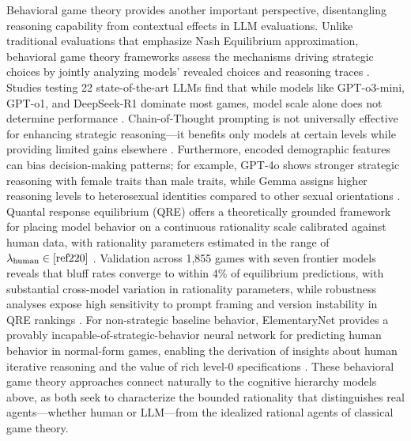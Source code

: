 \documentclass[11pt]{article}
\begin{document}
Behavioral game theory provides another important perspective, disentangling reasoning capability from contextual effects in LLM evaluations. Unlike traditional evaluations that emphasize Nash Equilibrium approximation, behavioral game theory frameworks assess the mechanisms driving strategic choices by jointly analyzing models' revealed choices and reasoning traces \cite{ref88,ref219}. Studies testing 22 state-of-the-art LLMs find that while models like GPT-o3-mini, GPT-o1, and DeepSeek-R1 dominate most games, model scale alone does not determine performance \cite{ref88}. Chain-of-Thought prompting is not universally effective for enhancing strategic reasoning---it benefits only models at certain levels while providing limited gains elsewhere \cite{ref88}. Furthermore, encoded demographic features can bias decision-making patterns; for example, GPT-4o shows stronger strategic reasoning with female traits than male traits, while Gemma assigns higher reasoning levels to heterosexual identities compared to other sexual orientations \cite{ref88}. Quantal response equilibrium (QRE) offers a theoretically grounded framework for placing model behavior on a continuous rationality scale calibrated against human data, with rationality parameters estimated in the range of \(\lambda_{\text{human}} \in \cite{ref220}\) \cite{ref221}. Validation across 1,855 games with seven frontier models reveals that bluff rates converge to within 4\% of equilibrium predictions, with substantial cross-model variation in rationality parameters, while robustness analyses expose high sensitivity to prompt framing and version instability in QRE rankings \cite{ref221}. For non-strategic baseline behavior, ElementaryNet provides a provably incapable-of-strategic-behavior neural network for predicting human behavior in normal-form games, enabling the derivation of insights about human iterative reasoning and the value of rich level-0 specifications \cite{ref222}. These behavioral game theory approaches connect naturally to the cognitive hierarchy models above, as both seek to characterize the bounded rationality that distinguishes real agents---whether human or LLM---from the idealized rational agents of classical game theory.
\end{document}
